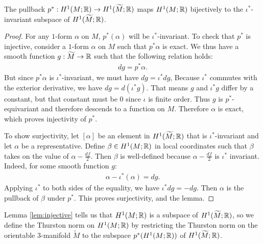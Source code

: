 \begin{lem}
  \label{lem:injective}
  The pullback $p^{\ast}:H^1(M;\mathbb{R})\rightarrow H^1(\widetilde{M};\mathbb{R})$ maps $H^1(M; \mathbb{R})$ bijectively to the $\iota^{\ast}$-invariant subspace of
  $H^1(\widetilde{M}; \mathbb{R})$.
\end{lem}
\begin{proof}
  For any $1$-form $\alpha$ on $M$, $p^{\ast}(\alpha)$ will be
  $\iota^{\ast}$-invariant. %
  To check that $p^\ast$ is injective, consider a $1$-form $\alpha$ on $M$ such that $p^{\ast}\alpha$
  is exact. We thus have a smooth function $g:\widetilde{M}\to\mathbb{R}$ such that the following relation holds:
    \begin{align*}
        dg = p^{\ast} \alpha.
    \end{align*}
    But since $p^{\ast}\alpha$ is $\iota^{\ast}$-invariant, we must have $dg = \iota^{\ast} dg$,
    Because $\iota^\ast$ commutes with the exterior derivative, we have $dg = d(\iota^{\ast}g)$. That means $g$
    and $\iota^{\ast}g$ differ by a constant, but that constant must be $0$ since $\iota$ is finite
    order. Thus $g$ is $p^*$-equivariant and therefore descends to a function on $M$. Therefore $\alpha$ is exact, which
    proves injectivity of $p^{\ast}$. 
    
    To show surjectivity, let $[\alpha]$ be an element in
    $H^1(\widetilde{M}; \mathbb{R})$ that is $\iota^{\ast}$-invariant and let $\alpha$ be a representative.  Define $\beta\in H^1(M;\mathbb{R})$ in local coordinates such that $\beta$ takes on the value of $\alpha-\frac{df}{2}$.  Then $\beta$ is well-defined because $\alpha-\frac{df}{2}$ is $\iota^\ast$ invariant.  Indeed, for some smooth function $g$:
    \begin{align*}
        \alpha - \iota^{\ast}(\alpha) = dg.
    \end{align*}
    Applying $\iota^\ast$ to both sides of the equality, we have $\iota^{\ast}dg = -dg$. Then $\alpha$ is the pullback of $\beta$ under %
    $p^{\ast}$. This proves surjectivity, and the lemma.
\end{proof}

Lemma \ref{lem:injective} tells us that $H^1(M; \mathbb{R})$ is a subspace of $H^1(\widetilde{M}; \mathbb{R})$, so we define the Thurston norm on $H^1(M; \mathbb{R})$ by restricting the Thurston norm on the orientable 3-manifold $\widetilde{M}$ to the subspace $p^*(H^1(M;\mathbb{R}))$ of $H^1(\widetilde{M};\mathbb{R})$.

